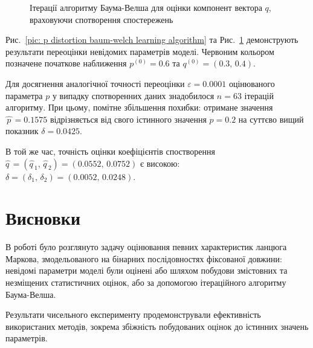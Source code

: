 \documentclass[]{iptconf}
\theoremstyle{plain}
\begin{document}
\begin{figure}[H]\centering
    \caption{Ітерації алгоритму Баума-Велша для оцінки компонент вектора $q$, враховуючи спотворення спостережень}
    \label{pic: q distortion baum-welch learning algorithm}
\end{figure}

\newpage
Рис.~\ref{pic: p distortion baum-welch learning algorithm} та Рис.~\ref{pic: q distortion baum-welch learning algorithm} демонструють результати переоцінки невідомих параметрів моделі. Червоним кольором позначене початкове наближення $p^{(0)}=0.6$ та $q^{(0)}=(0.3,\,0.4)$. 

Для досягнення аналогічної точності переоцінки $\varepsilon=0.0001$ оцінюваного параметра $p$ у випадку спотворенних даних знадобилося $n=63$ ітерацій алгоритму.   При цьому, помітне збільшення похибки: отримане значення $\widehat{\,p\,}=0.1575$ відрізняється від свого істинного значення $p=0.2$ на суттєво вищий показник $\delta=0.0425$. 

В той же час, точність оцінки коефіцієнтів спостворення $\widehat{q\,} = \left( \widehat{q\,}_1,\,\widehat{q\,}_2 \right) = (0.0552,\,0.0752)$ є високою: $\delta=(\delta_1,\,\delta_2)=(0.0052,\,0.0248)$.

\section*{Висновки}

В роботі було розглянуто задачу оцінювання певних характеристик ланцюга Маркова, змодельованого на бінарних послідовностях фіксованої довжини: невідомі параметри моделі були оцінені або шляхом побудови змістовних та незміщених статистичних оцінок, або за допомогою ітераційного алгоритму Баума-Велша.

Результати чисельного експерименту продемонстрували ефективність використаних методів, зокрема збіжність побудованих оцінок до істинних значень параметрів.
\end{document}
